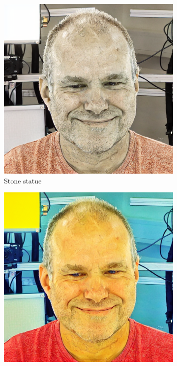 \begin{figure}
\begin{subfigure}{0.18\linewidth}
        \includegraphics[width=\textwidth]{Figures/naive/low_cfg/ipix2pix_sven_stone/0-2-4-2-293_210300_829.png}
        \caption{Stone statue}
	\end{subfigure}
    \begin{subfigure}{0.18\linewidth}
        \includegraphics[width=\textwidth]{Figures/naive/default/ipix2pix_sven_fauvism/0-2-4-2-293_210300_829.png}

\end{subfigure}
\end{figure}
